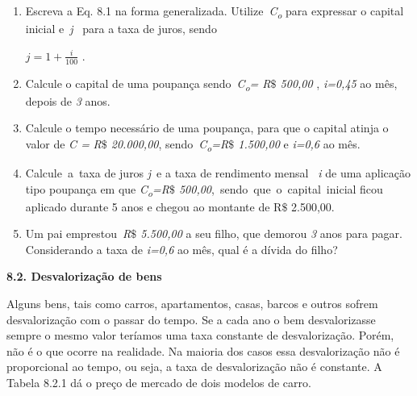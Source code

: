 \documentclass[12pt]{article}
\begin{document}
\vspace{\baselineskip}
\begin{enumerate}
	\item Escreva a Eq. 8.1 na forma generalizada. Utilize\  \textit{C\textsubscript{o}} para expressar o capital inicial e\   \textit{j} \  para a taxa de juros, sendo\par

 \( j=1+\frac{i}{100} \) .\par


\vspace{\baselineskip}
	\item Calcule o capital de uma poupança sendo\  \textit{C\textsubscript{o}= R$\$$  500,00 },\textit{ i=0,45 }ao mês, depois de \textit{3 }anos.\ \  \par

	\item Calcule o tempo necessário de uma poupança, para que o capital atinja o valor de \textit{C =} \textit{R$\$$  20.000,00}, sendo\  \textit{C\textsubscript{o}=R$\$$  1.500,00 } e\textit{ i=0,6 }ao mês.\  \par

	\item Calcule\ a\ taxa de juros   \textit{j}\  e a taxa de rendimento mensal \textit{\  i } de uma aplicação tipo poupança em que \textit{C\textsubscript{o}=R$\$$  500,00},\ sendo\ que\ o\ capital\ inicial ficou aplicado durante 5 anos e chegou ao montante de R$\$$   2.500,00.     \par

	\item Um pai emprestou\  \textit{R$\$$  5.500,00} a seu filho, que demorou \textit{3} anos para pagar. Considerando a taxa de\textit{ i=0,6 }ao mês, qual é a dívida do filho?\ \  
\end{enumerate}\par


\vspace{\baselineskip}
{\fontsize{14pt}{16.8pt}\selectfont \textbf{8.2. Desvalorização de bens}\par}\par


\vspace{\baselineskip}
Alguns bens, tais como carros, apartamentos, casas, barcos e outros sofrem desvalorização com o passar do tempo. Se a cada ano o bem desvalorizasse sempre o mesmo valor teríamos uma taxa constante de desvalorização. Porém, não é o que ocorre na realidade. Na maioria dos casos essa desvalorização não é proporcional ao tempo, ou seja, a taxa de desvalorização não é constante. A Tabela 8.2.1 dá o preço de mercado de dois modelos de carro. \par
\end{document}
